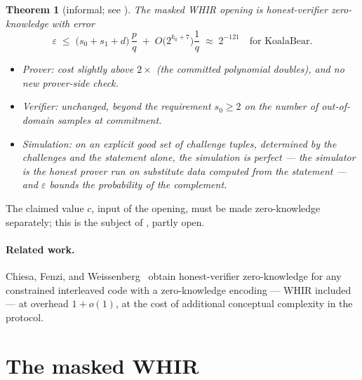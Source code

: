 \documentclass{article}
\newcommand{\extdeg}{d}
\newtheorem{theorem}{Theorem}[section]
\theoremstyle{definition}
\begin{document}
\begin{theorem}[informal; see ]\label{thm:main}
The masked WHIR opening is honest-verifier zero-knowledge with error
\[
\varepsilon \;\leq\; \big(s_0 + s_1 + \extdeg\big)\, \frac{p}{q} \;+\; O\big(2^{k_0+7}\big)\frac{1}{q} \;\approx\; 2^{-121} \quad \text{for KoalaBear} .
\]
\begin{itemize}
    \item \emph{Prover:} cost slightly above $2\times$ (the committed polynomial doubles), and no new prover-side check.
    \item \emph{Verifier:} unchanged, beyond the requirement $s_0 \geq 2$ on the number of out-of-domain samples at commitment.
    \item \emph{Simulation:} on an explicit \emph{good set} of challenge tuples, determined by the challenges and the statement alone, the simulation is \emph{perfect} --- the simulator is the honest prover run on substitute data computed from the statement --- and $\varepsilon$ bounds the probability of the complement.
\end{itemize}
\end{theorem}

The claimed value $c$, input of the opening, must be made zero-knowledge separately; this is the subject of , partly open.

\paragraph{Related work.} Chiesa, Fenzi, and Weissenberg~\cite{CFW26} obtain honest-verifier zero-knowledge for any constrained interleaved code with a zero-knowledge encoding --- WHIR included --- at overhead $1 + o(1)$, at the cost of additional conceptual complexity in the protocol.

\section{The masked WHIR}\label{sec:zk-whir}
\end{document}
